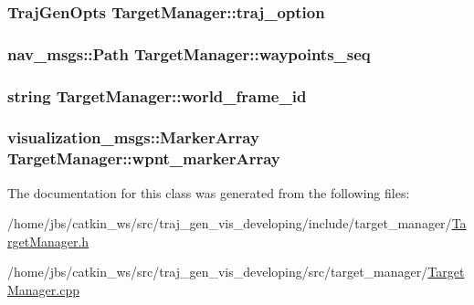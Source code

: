 \subsubsection[{\texorpdfstring{traj\+\_\+option}{traj_option}}]{\setlength{\rightskip}{0pt plus 5cm}Traj\+Gen\+Opts Target\+Manager\+::traj\+\_\+option\hspace{0.3cm}{\ttfamily [private]}}\hypertarget{class_target_manager_aedeaed09b33f06298fc63d0a87df0f37}{}\label{class_target_manager_aedeaed09b33f06298fc63d0a87df0f37}
\subsubsection[{\texorpdfstring{waypoints\+\_\+seq}{waypoints_seq}}]{\setlength{\rightskip}{0pt plus 5cm}nav\+\_\+msgs\+::\+Path Target\+Manager\+::waypoints\+\_\+seq\hspace{0.3cm}{\ttfamily [private]}}\hypertarget{class_target_manager_adde18a55a5e093c08584f625e76a0c9e}{}\label{class_target_manager_adde18a55a5e093c08584f625e76a0c9e}
\subsubsection[{\texorpdfstring{world\+\_\+frame\+\_\+id}{world_frame_id}}]{\setlength{\rightskip}{0pt plus 5cm}string Target\+Manager\+::world\+\_\+frame\+\_\+id\hspace{0.3cm}{\ttfamily [private]}}\hypertarget{class_target_manager_aaab8041311692af50c7e8e3578072df2}{}\label{class_target_manager_aaab8041311692af50c7e8e3578072df2}
\subsubsection[{\texorpdfstring{wpnt\+\_\+marker\+Array}{wpnt_markerArray}}]{\setlength{\rightskip}{0pt plus 5cm}visualization\+\_\+msgs\+::\+Marker\+Array Target\+Manager\+::wpnt\+\_\+marker\+Array\hspace{0.3cm}{\ttfamily [private]}}\hypertarget{class_target_manager_afe26632f7b5444f6922016175b5c1a94}{}\label{class_target_manager_afe26632f7b5444f6922016175b5c1a94}


The documentation for this class was generated from the following files\+:\begin{DoxyCompactItemize}
\item 
/home/jbs/catkin\+\_\+ws/src/traj\+\_\+gen\+\_\+vis\+\_\+developing/include/target\+\_\+manager/\hyperlink{_target_manager_8h}{Target\+Manager.\+h}\item 
/home/jbs/catkin\+\_\+ws/src/traj\+\_\+gen\+\_\+vis\+\_\+developing/src/target\+\_\+manager/\hyperlink{_target_manager_8cpp}{Target\+Manager.\+cpp}\end{DoxyCompactItemize}
